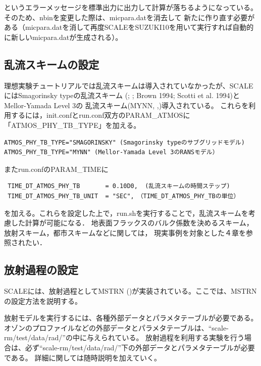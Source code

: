 \noindent というエラーメッセージを標準出力に出力して計算が落ちるようになっている。
そのため、nbinを変更した際は、micpara.datを消去して
新たに作り直す必要がある（micpara.datを消して再度SCALEをSUZUKI10を用いて実行すれば自動的に新しいmicpara.datが生成される）。


\subsection{乱流スキームの設定} \label{sec:adv_turbulence}
理想実験チュートリアルでは乱流スキームは導入されていなかったが、SCALEにはSmagorinsky typeの乱流スキーム
(\cite{smagorinsky_1963}; \cite{lilly_1962}; Brown 1994; Scotti et al. 1994)とMellor-Yamada Level 3の
乱流スキーム(MYNN, \cite{my_1982},\cite{nakanishi_2004})導入されている。
これらを利用するには，init.confとrun.conf双方のPARAM\_ATMOSに「ATMOS\_PHY\_TB\_TYPE」を加える。

\begin{verbatim}
ATMOS_PHY_TB_TYPE="SMAGORINSKY" (Smagorinsky typeのサブグリッドモデル)
ATMOS_PHY_TB_TYPE="MYNN" (Mellor-Yamada Level 3のRANSモデル）
\end{verbatim}

またrun.confのPARAM\_TIMEに

\begin{verbatim}
 TIME_DT_ATMOS_PHY_TB       = 0.10D0,  (乱流スキームの時間ステップ)
 TIME_DT_ATMOS_PHY_TB_UNIT  = "SEC",　（TIME_DT_ATMOS_PHY_TBの単位）
\end{verbatim}

を加える。これらを設定した上で，run.shを実行することで，乱流スキームを考慮した計算が可能になる．
地表面フラックスのバルク係数を決めるスキーム，放射スキーム，都市スキームなどに関しては，
現実事例を対象とした４章を参照されたい．


\subsection{放射過程の設定} \label{sec:adv_radiation}
SCALEには、放射過程としてMSTRN (\cite{sekiguchi_2008})が実装されている。ここでは、MSTRNの設定方法を説明する。

放射モデルを実行するには、各種外部データとパラメタテーブルが必要である。
オゾンのプロファイルなどの外部データとパラメタテーブルは、``scale-rm/test/data/rad/''の中に与えられている。
放射過程を利用する実験を行う場合は、必ず``scale-rm/test/data/rad/''下の外部データとパラメタテーブルが必要である。
詳細に関しては随時説明を加えていく。


